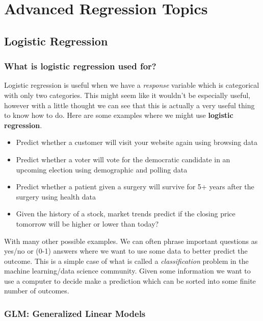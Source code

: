 \documentclass[
]{book}
\providecommand{\tightlist}{%
  \setlength{\itemsep}{0pt}\setlength{\parskip}{0pt}}
\theoremstyle{definition}
\theoremstyle{definition}
\theoremstyle{definition}
\theoremstyle{definition}
\theoremstyle{remark}
\begin{document}
\hypertarget{part-advanced-regression-topics}{%
\part{Advanced Regression Topics}\label{part-advanced-regression-topics}}

\hypertarget{logistic-regression}{%
\chapter{Logistic Regression}\label{logistic-regression}}

\hypertarget{what-is-logistic-regression-used-for}{%
\section{What is logistic regression used for?}\label{what-is-logistic-regression-used-for}}

Logistic regression is useful when we have a \emph{response} variable which is categorical with only two categories. This might seem like it wouldn't be especially useful, however with a little thought we can see that this is actually a very useful thing to know how to do. Here are some examples where we might use \textbf{logistic regression}.

\begin{itemize}
\tightlist
\item
  Predict whether a customer will visit your website again using browsing data
\item
  Predict whether a voter will vote for the democratic candidate in an upcoming election using demographic and polling data
\item
  Predict whether a patient given a surgery will survive for 5+ years after the surgery using health data
\item
  Given the history of a stock, market trends predict if the closing price tomorrow will be higher or lower than today?
\end{itemize}

With many other possible examples. We can often phrase important questions as yes/no or (0-1) answers where we want to use some data to better predict the outcome. This is a simple case of what is called a \emph{classification} problem in the machine learning/data science community. Given some information we want to use a computer to decide make a prediction which can be sorted into some finite number of outcomes.

\hypertarget{glm-generalized-linear-models}{%
\section{GLM: Generalized Linear Models}\label{glm-generalized-linear-models}}
\end{document}
